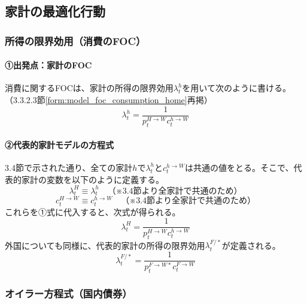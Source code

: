 \subsection{家計の最適化行動}
\label{sec:chapter3_final_equations_utility}
\subsubsection{所得の限界効用（消費のFOC）}
\label{sec:chapter3_final_equations_utility_lambda}
\paragraph{①出発点：家計のFOC}\label{sec:chapter3_final_equations_utility_lambda_origin}
消費に関するFOCは、家計の所得の限界効用\(\lambda_t^h\)を用いて次のように書ける。（3.3.2.3節\eqref{form:model_foc_consumption_home}再掲）
\begin{equation}
\lambda_t^h=\frac{1}{p_t^{H\to W}c_t^{h\to W}}
\label{form:model_final_equations_utility_foc_restated}
\end{equation}

\paragraph{②代表的家計モデルの方程式}\label{sec:chapter3_final_equations_utility_lambda_ra_eq}
3.4節で示された通り、全ての家計\(h\)で\(\lambda_t^h\)と\(c_t^{h\to W}\)は共通の値をとる。そこで、代表的家計の変数を以下のように定義する。
\begin{equation}
\lambda_t^H\equiv\lambda_t^h\quad（※3.4節より全家計で共通のため）
\label{form:model_final_equations_utility_lambda_h_def}
\end{equation}
\begin{equation}
c_t^{H\to W}\equiv c_t^{h\to W}\quad（※3.4節より全家計で共通のため）
\label{form:model_final_equations_utility_consumption_w_def}
\end{equation}
これらを①式に代入すると、次式が得られる。
\begin{equation}
\lambda_t^H=\frac{1}{p_t^{H\to W}c_t^{h\to W}}
\label{form:model_final_equations_utility_lambda_h}
\end{equation}
外国についても同様に、代表的家計の所得の限界効用\(\lambda_t^{F/*}\)が定義される。
\begin{equation}
\lambda_t^{F/*}=\frac{1}{p_t^{F\to W*}c_t^{F\to W}}
\label{form:model_final_equations_utility_lambda_f}
\end{equation}

\subsubsection{オイラー方程式（国内債券）}
\label{sec:chapter3_final_equations_utility_euler}
